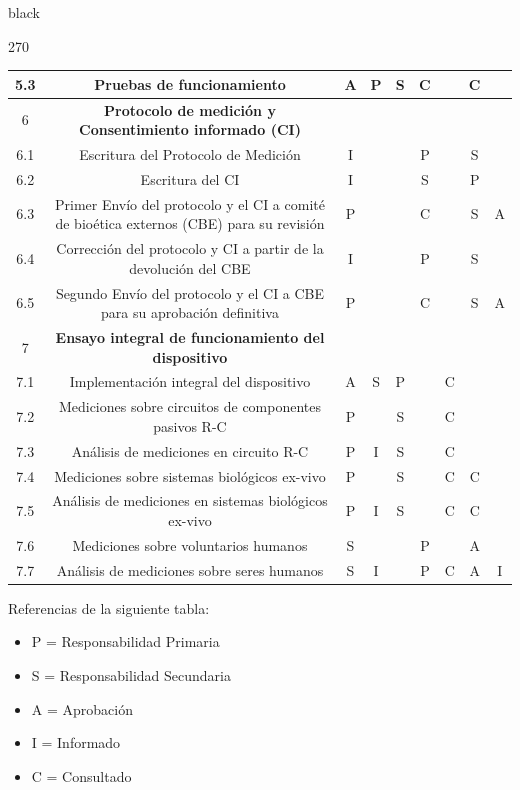 \documentclass[11pt]{charter}
\begin{document}
\begin{consigna}{black}
\begin{table}[htpb]
\begin{turn}{270}
{\begin{tabular}{|c|c|c|c|c|c|c|c|c|}
5.3	& Pruebas de funcionamiento & A & P & S & C & & C & \\ \hline
6 & \textbf{Protocolo de medición y Consentimiento informado (CI)} &  &  &  &  &  &  & \\ \hline
6.1 & Escritura del Protocolo de Medición & I &  &  & P &  & S & \\ \hline
6.2 & Escritura del CI  & I &  &  & S &  & P & 	\\ \hline
6.3 & Primer Envío del protocolo y el CI a comité de bioética externos (CBE) para su revisión & P &  &  & C &  & S & A  \\ \hline
6.4 & Corrección del protocolo y CI a partir de la devolución del CBE & I &  &  & P & & S &	\\ \hline
6.5 & Segundo Envío del protocolo y el CI a CBE para su aprobación definitiva & P &  &  & C &  & S & A  \\ \hline
7 & \textbf{Ensayo integral de funcionamiento del dispositivo}	&  &  &  &  &  &  & \\ \hline						
7.1 & Implementación integral del dispositivo & A & S & P &  & C &  & 	\\ \hline
7.2 & Mediciones sobre circuitos de componentes pasivos R-C & P &  & S &  & C &  & 	\\ \hline	
7.3 & Análisis de mediciones en circuito R-C & P & I & S &  & C &  & \\ \hline		
7.4 & Mediciones sobre sistemas biológicos ex-vivo & P &  & S &  & 	C & C & \\ \hline
7.5 & Análisis de mediciones en sistemas biológicos ex-vivo & P & I & S &  & C & C & \\ \hline	
7.6 & Mediciones sobre voluntarios humanos & S  &  &  & P &  & 	A & \\ \hline
7.7 & Análisis de mediciones sobre seres humanos & S & I &  & P & C & A & I \\ \hline


 \end{tabular}%
}
\end{turn}
\end{table}

{\footnotesize
Referencias de la siguiente tabla:
\begin{itemize}
	\item P = Responsabilidad Primaria
	\item S = Responsabilidad Secundaria
	\item A = Aprobación
	\item I = Informado
	\item C = Consultado
\end{itemize}
} %

%

\end{consigna}
\end{document}
